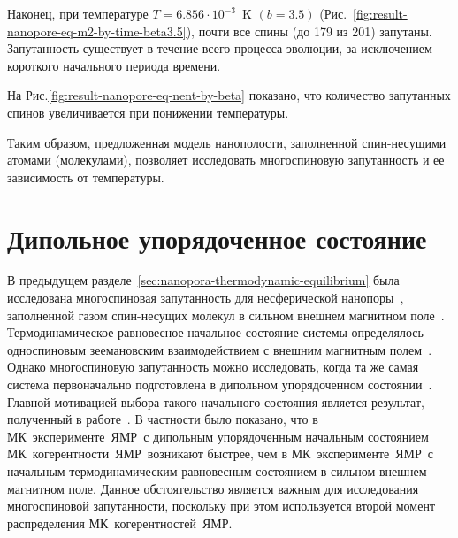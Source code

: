 Наконец, при температуре ${T= 6.856\cdot10^{-3}}$~K $(b=3.5)$ (Рис.~\ref{fig:result-nanopore-eq-m2-by-time-beta3.5}), почти все спины (до 179 из 201) запутаны. Запутанность существует в течение всего процесса эволюции, за исключением короткого начального периода времени.

На Рис.\ref{fig:result-nanopore-eq-nent-by-beta} показано, что количество запутанных спинов увеличивается при понижении температуры.


Таким образом, предложенная модель нанополости, заполненной спин-несущими атомами (молекулами), позволяет исследовать многоспиновую запутанность и ее зависимость от температуры.




\section{Дипольное упорядоченное состояние}
\label{sec:1}

В предыдущем разделе~\ref{sec:nanopora-thermodynamic-equilibrium} была исследована многоспиновая запутанность для несферической нанопоры~\cite{Doronin2019},
заполненной газом  спин-несущих молекул в сильном внешнем магнитном поле~\cite{Baugh2001,Doronin2009}.
Термодинамическое равновесное начальное состояние системы определялось односпиновым зеемановским взаимодействием с внешним магнитным полем~\cite{Doronin2007a}.
Однако  многоспиновую запутанность можно  исследовать,
когда та же самая система первоначально подготовлена в дипольном упорядоченном состоянии~\cite{Goldman1970}.
Главной мотивацией выбора такого начального состояния является результат, полученный в работе~\cite{Doronin2011}.
В частности было показано, что в МК~эксперименте~ЯМР~с дипольным упорядоченным начальным состоянием МК~когерентности~ЯМР~возникают быстрее,
чем в МК~эксперименте~ЯМР~с начальным термодинамическим равновесным состоянием в сильном внешнем магнитном поле.
Данное обстоятельство является важным для исследования многоспиновой запутанности,
поскольку при этом используется второй момент распределения МК~когерентностей~ЯМР.

